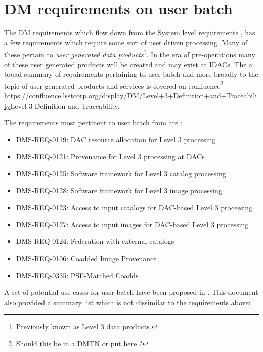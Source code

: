 \section{DM requirements on user batch} \label{sec:requirements}

The DM requirements  which flow down from the System level requirements ,
has  a few requirements which require some sort of user driven processing.
Many of these pertain to {\em user generated data products}\footnote{Previously known as Level 3 data products.}.
In the era of pre-operations many of these user generated products will be created and may exist at IDACs.
The a broad summary of requirements pertaining to user batch and more broadly to the topic of user generated products and services is covered on confluence\footnote{Should this be in a DMTN or put here ?} \url{https://confluence.lsstcorp.org/display/DM/Level+3+Definition+and+Traceability}{Level 3 Definition and Traceability}.

The requirements most pertinent to user batch from  are :

\begin{itemize}
\item DMS-REQ-0119: DAC resource allocation for Level 3 processing
\item DMS-REQ-0121: Provenance for Level 3 processing at DACs
\item DMS-REQ-0125: Software framework for Level 3 catalog processing
\item DMS-REQ-0128: Software framework for Level 3 image processing
\item DMS-REQ-0123: Access to input catalogs for DAC-based Level 3 processing
\item DMS-REQ-0127: Access to input images for DAC-based Level 3 processing
\item DMS-REQ-0124: Federation with external catalogs
\item DMS-REQ-0106: Coadded Image Provenance
\item DMS-REQ-0335: PSF-Matched Coadds
\end{itemize}


A set of potential use cases for user batch have been proposed in .
This document also provided a summary list which is not dissimilar to the requirements above:

